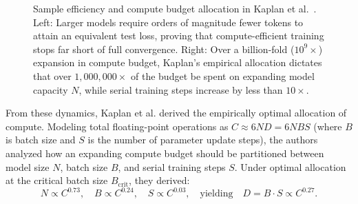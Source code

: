 \documentclass[../../main.tex]{subfiles}
\begin{document}
\begin{figure}[t]
\caption{Sample efficiency and compute budget allocation in Kaplan et al.~\cite{kaplan2020}. Left: Larger models require orders of magnitude fewer tokens to attain an equivalent test loss, proving that compute-efficient training stops far short of full convergence. Right: Over a billion-fold ($10^9\times$) expansion in compute budget, Kaplan's empirical allocation dictates that over $1,000,000\times$ of the budget be spent on expanding model capacity $N$, while serial training steps increase by less than $10\times$.}
\label{fig:kaplan_figures2_3}
\end{figure}

From these dynamics, Kaplan et al. derived the empirically optimal allocation of compute. Modeling total floating-point operations as $C \approx 6 N D = 6 N B S$ (where $B$ is batch size and $S$ is the number of parameter update steps), the authors analyzed how an expanding compute budget should be partitioned between model size $N$, batch size $B$, and serial training steps $S$. Under optimal allocation at the critical batch size $B_{\text{crit}}$, they derived:
\begin{equation}
N \propto C^{0.73}, \quad B \propto C^{0.24}, \quad S \propto C^{0.03}, \quad \text{yielding} \quad D = B \cdot S \propto C^{0.27}.
\label{eq:kaplan_power_scaling}
\end{equation}
\end{document}
